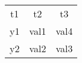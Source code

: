 \begin{tabular}{|c|c|c|}
  \hline
  t1 & t2 & t3 \\
  y1 & val1 & val4 \\
  y2 & val2 & val3 \\
  \hline
\end{tabular}
